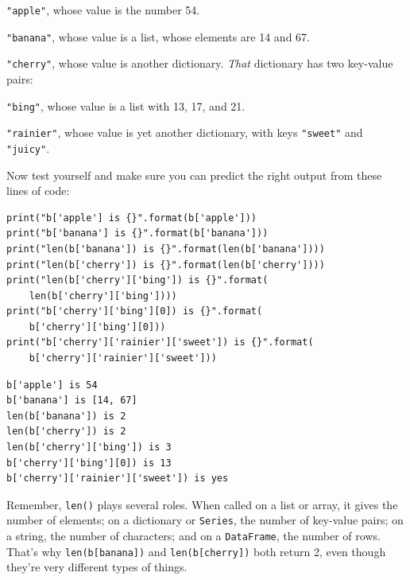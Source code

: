 \begin{compactitem}
\item \texttt{"apple"}, whose value is the number 54.
\item \texttt{"banana"}, whose value is a list, whose elements are 14 and 67.
\item \texttt{"cherry"}, whose value is another dictionary. \textit{That}
dictionary has two key-value pairs:
    \begin{compactitem}
    \item \texttt{"bing"}, whose value is a list with 13, 17, and 21.
    \item \texttt{"rainier"}, whose value is yet another dictionary, with keys
\texttt{"sweet"} and \texttt{"juicy"}.
    \end{compactitem}
\end{compactitem}

Now test yourself and make sure you can predict the right output from these
lines of code:

\begin{Verbatim}[fontsize=\small,samepage=true,frame=single,framesep=2mm]
print("b['apple'] is {}".format(b['apple']))
print("b['banana'] is {}".format(b['banana']))
print("len(b['banana']) is {}".format(len(b['banana'])))
print("len(b['cherry']) is {}".format(len(b['cherry'])))
print("len(b['cherry']['bing']) is {}".format(
    len(b['cherry']['bing'])))
print("b['cherry']['bing'][0]) is {}".format(
    b['cherry']['bing'][0]))
print("b['cherry']['rainier']['sweet']) is {}".format(
    b['cherry']['rainier']['sweet']))
\end{Verbatim}
\vspace{-.2in}

\begin{Verbatim}[fontsize=\small,samepage=true,frame=leftline,framesep=5mm,framerule=1mm]
b['apple'] is 54
b['banana'] is [14, 67]
len(b['banana']) is 2
len(b['cherry']) is 2
len(b['cherry']['bing']) is 3
b['cherry']['bing'][0]) is 13
b['cherry']['rainier']['sweet']) is yes
\end{Verbatim}


Remember, \texttt{len()} plays several roles. When called on a list or array,
it gives the number of elements; on a dictionary or \texttt{Series}, the number
of key-value pairs; on a string, the number of characters; and on a
\texttt{DataFrame}, the number of rows. That's why
\texttt{len(b[\textquotesingle banana\textquotesingle])}
and \texttt{len(b[\textquotesingle cherry\textquotesingle])} both return 2, even though they're very different
types of things.

